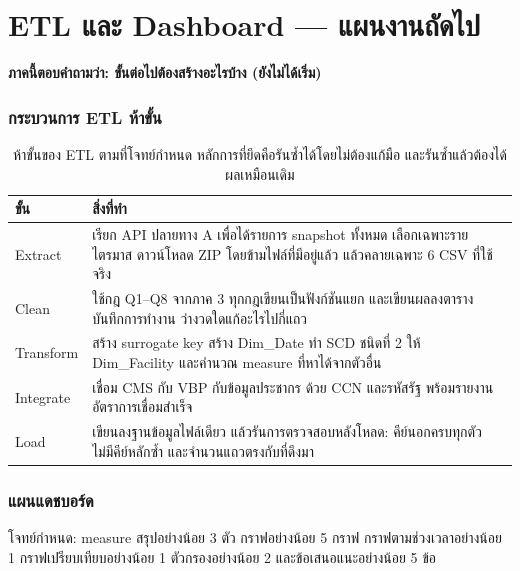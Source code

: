 \documentclass[11pt,a4paper]{article}
\newcommand{\sansall}{\sffamily}
\begin{document}
\clearpage

\part{ETL และ Dashboard — แผนงานถัดไป}

\textbf{ภาคนี้ตอบคำถามว่า: ขั้นต่อไปต้องสร้างอะไรบ้าง (ยังไม่ได้เริ่ม)}

\section{กระบวนการ ETL ห้าขั้น}

\begin{table}[H]\centering\small
\begin{tabular}{L{2.2cm} L{13.6cm}}
\toprule
\sansall\bfseries ขั้น & \sansall\bfseries สิ่งที่ทำ \\
\midrule
Extract & เรียก API ปลายทาง A เพื่อได้รายการ snapshot ทั้งหมด
  เลือกเฉพาะรายไตรมาส ดาวน์โหลด ZIP โดยข้ามไฟล์ที่มีอยู่แล้ว
  แล้วคลายเฉพาะ 6 CSV ที่ใช้จริง \\
\addlinespace
Clean & ใช้กฎ Q1--Q8 จากภาค 3 ทุกกฎเขียนเป็นฟังก์ชันแยก
  และเขียนผลลงตารางบันทึกการทำงาน ว่างวดใดแก้อะไรไปกี่แถว \\
\addlinespace
Transform & สร้าง surrogate key สร้าง Dim\_Date ทำ SCD ชนิดที่ 2 ให้ Dim\_Facility
  และคำนวณ measure ที่หาได้จากตัวอื่น \\
\addlinespace
Integrate & เชื่อม CMS กับ VBP กับข้อมูลประชากร ด้วย CCN และรหัสรัฐ
  พร้อมรายงานอัตราการเชื่อมสำเร็จ \\
\addlinespace
Load & เขียนลงฐานข้อมูลไฟล์เดียว แล้วรันการตรวจสอบหลังโหลด: คีย์นอกครบทุกตัว
  ไม่มีคีย์หลักซ้ำ และจำนวนแถวตรงกับที่ดึงมา \\
\bottomrule
\end{tabular}
\caption{ห้าขั้นของ ETL ตามที่โจทย์กำหนด หลักการที่ยึดคือรันซ้ำได้โดยไม่ต้องแก้มือ และรันซ้ำแล้วต้องได้ผลเหมือนเดิม}
\end{table}

\section{แผนแดชบอร์ด}

โจทย์กำหนด: measure สรุปอย่างน้อย 3 ตัว กราฟอย่างน้อย 5 กราฟ
กราฟตามช่วงเวลาอย่างน้อย 1 กราฟเปรียบเทียบอย่างน้อย 1 ตัวกรองอย่างน้อย 2
และข้อเสนอแนะอย่างน้อย 5 ข้อ
\end{document}
